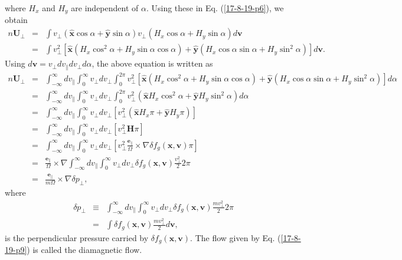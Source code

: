 \documentclass{article}
\begin{document}
where $H_x$ and $H_y$ are independent of $\alpha$. Using these in Eq.
(\ref{17-8-19-p6}), we obtain
\begin{eqnarray}
  n\mathbf{U}_{\perp} & = & \int v_{\perp} (\hat{\mathbf{x}} \cos \alpha +
  \hat{\mathbf{y}} \sin \alpha) v_{\perp} (H_x \cos \alpha + H_y \sin \alpha)
  d\mathbf{v} \nonumber\\
  & = & \int v_{\perp}^2 [\hat{\mathbf{x}} (H_x \cos^2 \alpha + H_y \sin
  \alpha \cos \alpha) + \hat{\mathbf{y}} (H_x \cos \alpha \sin \alpha + H_y
  \sin^2 \alpha)] d\mathbf{v}. 
\end{eqnarray}
Using $d\mathbf{v}= v_{\perp} d v_{\parallel} d v_{\perp} d \alpha$, the above
equation is written as
\begin{eqnarray}
  n\mathbf{U}_{\perp} & = & \int_{- \infty}^{\infty} d v_{\parallel}
  \int_0^{\infty} v_{\perp} d v_{\perp} \int_0^{2 \pi} v_{\perp}^2
  [\hat{\mathbf{x}} (H_x \cos^2 \alpha + H_y \sin \alpha \cos \alpha) +
  \hat{\mathbf{y}} (H_x \cos \alpha \sin \alpha + H_y \sin^2 \alpha)] d \alpha
  \nonumber\\
  & = & \int_{- \infty}^{\infty} d v_{\parallel} \int_0^{\infty} v_{\perp} d
  v_{\perp} \int_0^{2 \pi} v_{\perp}^2 (\hat{\mathbf{x}} H_x \cos^2 \alpha +
  \hat{\mathbf{y}} H_y \sin^2 \alpha) d \alpha \nonumber\\
  & = & \int_{- \infty}^{\infty} d v_{\parallel} \int_0^{\infty} v_{\perp} d
  v_{\perp} [v_{\perp}^2 (\hat{\mathbf{x}} H_x \pi + \hat{\mathbf{y}} H_y
  \pi)] \nonumber\\
  & = & \int_{- \infty}^{\infty} d v_{\parallel} \int_0^{\infty} v_{\perp} d
  v_{\perp} [v_{\perp}^2 \mathbf{H} \pi] \nonumber\\
  & = & \int_{- \infty}^{\infty} d v_{\parallel} \int_0^{\infty} v_{\perp} d
  v_{\perp} [v_{\perp}^2 \frac{\mathbf{e}_{\parallel}}{\Omega} \times \nabla
  \delta f_g (\mathbf{x}, \mathbf{v}) \pi] \nonumber\\
  & = & \frac{\mathbf{e}_{\parallel}}{\Omega} \times \nabla \int_{-
  \infty}^{\infty} d v_{\parallel} \int_0^{\infty} v_{\perp} d v_{\perp}
  \delta f_g (\mathbf{x}, \mathbf{v}) \frac{v_{\perp}^2}{2} 2 \pi \nonumber\\
  & = & \frac{\mathbf{e}_{\parallel}}{m \Omega} \times \nabla \delta
  p_{\perp},  \label{17-8-19-p9}
\end{eqnarray}
where
\begin{eqnarray}
  \delta p_{\perp} & \equiv & \int_{- \infty}^{\infty} d v_{\parallel}
  \int_0^{\infty} v_{\perp} d v_{\perp} \delta f_g (\mathbf{x}, \mathbf{v})
  \frac{m v_{\perp}^2}{2} 2 \pi \nonumber\\
  & = & \int \delta f_g (\mathbf{x}, \mathbf{v}) \frac{m v_{\perp}^2}{2}
  d\mathbf{v}, 
\end{eqnarray}
is the perpendicular pressure carried by $\delta f_g (\mathbf{x},
\mathbf{v})$. The flow given by Eq. (\ref{17-8-19-p9}) is called the
diamagnetic flow.
\end{document}
